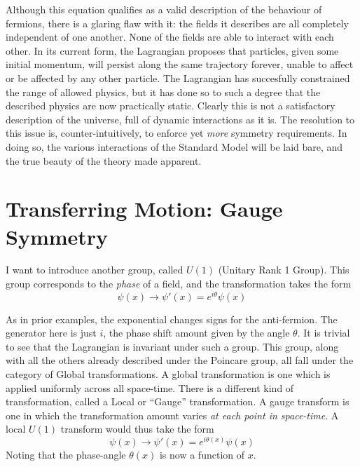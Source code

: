     Although this equation qualifies as a valid description of the behaviour of fermions,
        there is a glaring flaw with it: the fields it describes are all completely independent of one another.
    None of the fields are able to interact with each other.
    In its current form, the Lagrangian proposes that particles, given some initial momentum,
        will persist along the same trajectory forever, unable to affect or be affected by any other particle.
    The Lagrangian has succesfully constrained the range of allowed physics,
        but it has done so to such a degree that the described physics are now practically static.
    Clearly this is not a satisfactory description of the universe, full of dynamic interactions as it is.
    The resolution to this issue is, counter-intuitively, to enforce yet \textit{more} symmetry requirements.
    In doing so, the various interactions of the Standard Model will be laid bare,
        and the true beauty of the theory made apparent.



\section{Transferring Motion: Gauge Symmetry}

    I want to introduce another group, called $U(1)$ (Unitary Rank 1 Group).
    This group corresponds to the \textit{phase} of a field, and the transformation takes the form
    \begin{equation}
        \psi(x) \to \psi'(x) = e^{i\theta} \psi(x)
    \end{equation}

    As in prior examples, the exponential changes signs for the anti-fermion.
    The generator here is just $i$, the phase shift amount given by the angle $\theta$.
    It is trivial to see that the Lagrangian is invariant under such a group.
    This group, along with all the others already described under the Poincare group,
        all fall under the category of Global transformations.
    A global transformation is one which is applied uniformly across all space-time.
    There is a different kind of transformation, called a Local or ``Gauge'' transformation.
    A gauge transform is one in which the transformation amount varies \textit{at each point in space-time}.
    A local $U(1)$ transform would thus take the form 
    \begin{equation}
        \psi(x) \to \psi'(x) = e^{i\theta(x)} \psi(x)
    \end{equation}
    Noting that the phase-angle $\theta(x)$ is now a function of $x$.

